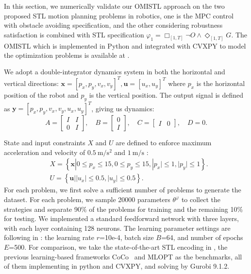 \documentclass[a4paper]{report}
\begin{document}
In this section, we numerically validate our OMISTL approach on the two proposed STL motion planning problems in robotics, one is the MPC control with obstacle avoiding specification, and the other considering robustness satisfaction is combined with STL specification $\varphi_1=\Box_{[1,T]}\lnot O\wedge \Diamond_{[1,T]}G $. The OMISTL which is implemented in Python and integrated with CVXPY to model the optimization problems is available at \cite[]{OMISTL_git}.

We adopt a double-integrator dynamics system in both the horizontal and vertical directions: 
$
\boldsymbol{x}=\left[p_{x}, p_{y}, v_{x}, v_{y}\right]^{T}, \boldsymbol{u}=\left[{u}_{x}, {u}_{y}\right]^{T}
$
where $p_{x}$ is the horizontal position of the robot and $p_{y}$ is the vertical position. The output signal is defined as $\boldsymbol{y}=\left[p_{x}, p_{y},v_x,v_y,u_x,u_y\right]^{T}$, giving us dynamics:
$$
A=\left[\begin{array}{ll}
I & I \\
0 & I
\end{array}\right], \quad B=\left[\begin{array}{l}
0 \\
I
\end{array}\right], \quad C=\left[\begin{array}{ll}
I & 0
\end{array}\right], \quad D=0 .
$$

State and input constraints $X$ and $U$ are defined to enforce maximum acceleration and velocity of $0.5 \mathrm{~m} / \mathrm{s}^{2}$ and $1 \mathrm{~m} / \mathrm{s}$ :
$$
\begin{aligned}
&X=\left\{\boldsymbol{x}\left|0 \leq p_{x} \leq 15,0 \leq p_{y} \leq 15,\right| p_{x}|\leq 1,| p_{y} \mid \leq 1\right\} . \\
&U=\left\{\boldsymbol{u}|| u_{x}|\leq 0.5,| u_{y} \mid \leq 0.5\right\}.
\end{aligned}
$$For each problem, we first solve a sufficient number of problems to generate the dataset. For each problem, we sample 20000 parameters $\theta^\varphi$ to collect the strategies and separate 90\% of the problems for training and the remaining 10\% for testing. We implemented a standard feedforward network with three layers, with each layer containing 128 neurons. The learning parameter settings are following in \cite{Cauligi2020}: the learning rate $r$=10e-4, batch size $B$=64, and number of epochs $E$=500. For comparison, we take the state-of-the-art STL encoding in \cite[]{kurtz2022mixed}, the previous learning-based frameworks CoCo\cite[]{Cauligi2020} \ and MLOPT \cite[]{bertsimas2022online} as the benchmarks, all of them implementing in python and CVXPY, and solving by Gurobi 9.1.2.
\end{document}
